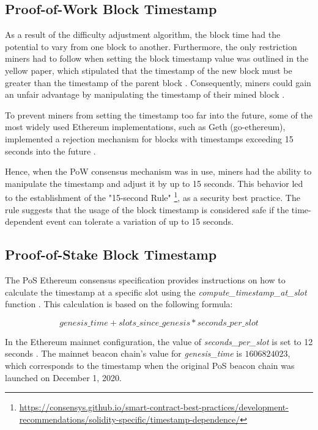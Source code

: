 \subsection{Proof-of-Work Block Timestamp}
As a result of the difficulty adjustment algorithm, the block time had the
potential to vary from one block to another. Furthermore, the only restriction
miners had to follow when setting the block timestamp value was outlined in the
yellow paper, which stipulated that the timestamp of the new block must be
greater than the timestamp of the parent block \cite{ethyellowpaper2023}.
Consequently, miners could gain an unfair advantage by manipulating the
timestamp of their mined block \cite{swc116}.


To prevent miners from setting the timestamp too far into the future, some of the most widely used Ethereum implementations, such as Geth (go-ethereum), implemented a rejection mechanism for blocks with timestamps exceeding 15 seconds into the future \cite{go-ethereum-15-sek-limit}.

Hence, when the PoW consensus mechanism was in use, miners had the ability to
manipulate the timestamp and adjust it by up to 15 seconds. This behavior led
to the establishment of the "15-second Rule"
\footnote{\url{https://consensys.github.io/smart-contract-best-practices/development-recommendations/solidity-specific/timestamp-dependence/}},
as a security best practice. The
rule suggests that the usage of the block timestamp is considered
safe if the time-dependent event can tolerate a variation of up to 15 seconds. 

\subsection{Proof-of-Stake Block Timestamp}

The PoS Ethereum consensus specification provides instructions on how to
calculate the timestamp at a specific slot using the
\textit{compute\_timestamp\_at\_slot} function \cite{compute-timestamp-at-slot}.
This calculation is based on the following formula:

\begin{equation}
genesis\_time + slots\_since\_genesis *
seconds\_per\_slot
\end{equation}


In the Ethereum mainnet configuration, the value of \textit{seconds\_per\_slot} is set to
12 seconds \cite{seconds-per-slot-mainnet} \cite{seconds-per-slot-mainnet-doc}.
The mainnet beacon chain's value for \textit{genesis\_time} is $1606824023$, which
corresponds to the timestamp when the original PoS beacon chain was launched on
December 1, 2020.

